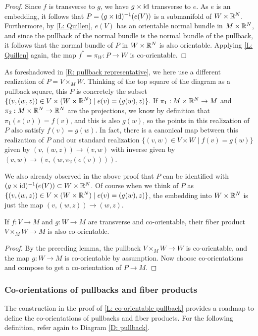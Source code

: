 \begin{proof}
Since $f$ is transverse to $g$, we have $g\times \mathrm{id}$ transverse to $e$. As $e$ is an embedding, it follows that  $P=(g\times \mathrm{id})^{-1}(e(V))$ is a submanifold of $W\times \mathbb{R}^N$. Furthermore, by \cref{L: Quillen}, $e(V)$ has an orientable normal bundle in $M\times \mathbb{R}^N$, and since the pullback of the normal bundle is the normal bundle of the pullback, it follows that the normal bundle of $P$ in $W\times \mathbb{R}^N$ is also orientable. Applying \cref{L: Quillen} again, the map $f^*=\pi_W:P\to W$ is co-orientable.
\end{proof}

\begin{remark}\label{R: pullback representative 2}
As foreshadowed in \cref{R: pullback representative}, we here use a different realization of $P=V\times_MW$. Thinking of the top square of the diagram as a pullback square, this $P$ is concretely the subset $\{(v,(w,z))\in V\times (W\times \mathbb{R}^N)\mid e(v)=(g(w),z)\}$. If $\pi_1:M\times \mathbb{R}^N\to M$ and $\pi_2:M\times \mathbb{R}^N\to \mathbb{R}^N$ are the projections, we know by definition that $\pi_1(e(v))=f(v)$, and this is also $g(w)$, so the points in this realization of $P$ also satisfy $f(v)=g(w)$. In  fact, there is a canonical map between this realization of $P$ and our standard realization $\{(v,w)\in V\times W\mid f(v)=g(w)\}$ given by $(v,(w,z))\to (v,w)$ with inverse given by $(v,w)\to (v,(w,\pi_2(e(v))))$.

We also already observed in the above proof that $P$ can be identified with $(g\times \mathrm{id})^{-1}(e(V))\subset W\times \mathbb{R}^N$. Of course when we think of $P$ as $\{(v,(w,z))\in V\times (W\times \mathbb{R}^N)\mid e(v)=(g(w),z)\}$, the embedding into $W\times \mathbb{R}^N$ is just the map $(v,(w,z))\to (w,z)$.
\end{remark}



\begin{corollary}
If $f:V\to M$ and $g:W\to M$ are transverse and co-orientable, their fiber product $V\times_MW \to M$ is also co-orientable.
\end{corollary}
\begin{proof}
By the preceding lemma, the pullback $V\times_MW\to W$ is co-orientable, and the map $g:W\to M$ is co-orientable by assumption. Now choose co-orientations and compose to get a co-orientation of $P\to M$.
\end{proof}






\subsubsection{Co-orientations of pullbacks and fiber products}\label{S: co-orientation of pullbacks}
The construction in the proof of \cref{L: co-orientable pullback} provides a roadmap to define the co-orientations of pullbacks and fiber products. For the following definition, refer again to Diagram \eqref{D: pullback}.

